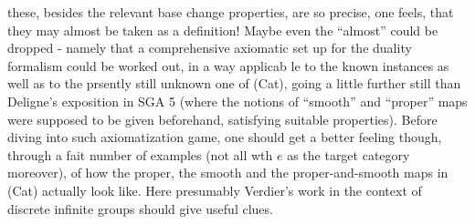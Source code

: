 
these,  besides the relevant base change properties,  are so precise,
one feels,  that they may almost be taken as a definition!  Maybe even
the ``almost'' could be dropped  -  namely that a comprehensive axiomatic
set up for the duality formalism could be worked out,  in a way applicab%
le to the known instances as well as to the prsently still unknown
one of (Cat),  going a little further still than Deligne's exposition
in SGA 5 (where the notions of ``smooth'' and ``proper'' maps were supposed
to be given beforehand,  satisfying suitable properties). Before diving
into such axiomatization game,  one should get a better feeling though,
through a fait number of examples (not all wth $e$ as the target category
moreover),  of how the proper,  the smooth and the proper-and-smooth
maps in (Cat) actually look like.  Here presumably Verdier's work in
the context of discrete infinite groups should give useful clues.

